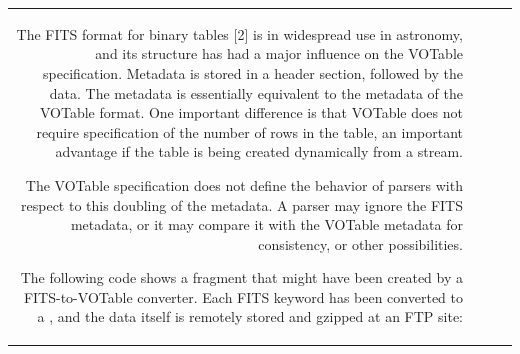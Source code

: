 \begin{tabular}{RRCp{0.8\textwidth}}
\begin{center}
{The FITS format for binary tables [2] is in widespread use in astronomy,
and its structure has had a major influence on the VOTable specification.
Metadata is stored in a header section, followed by the data. The
metadata is essentially equivalent to the metadata of the VOTable
format. One important difference is that VOTable does not require
specification of the number of rows in the table, an important
advantage if the table is being created dynamically from a stream.

The VOTable specification does not define the behavior of parsers
with respect to this doubling of the metadata. A parser may ignore
the FITS metadata, or it may compare it with the VOTable metadata for
consistency, or other possibilities.

The following code shows a fragment that might have been created
by a FITS-to-VOTable converter. Each FITS keyword has been converted
to a , and the data itself is remotely stored and gzipped at an
FTP site:

}
\end{center}
\end{tabular}
